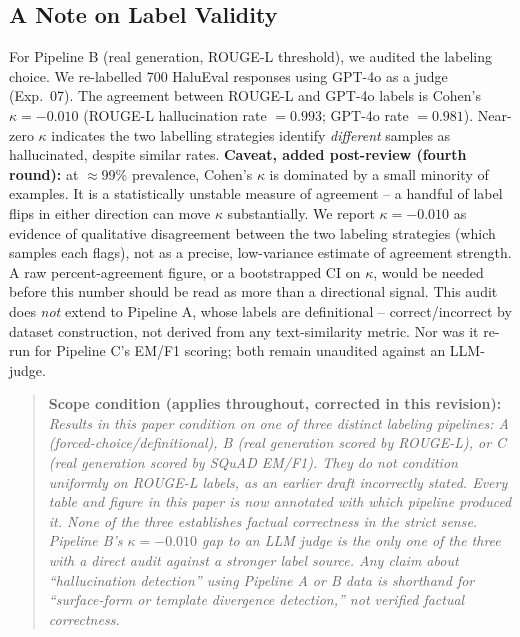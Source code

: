 \documentclass[onecolumn]{jmlr}
\begin{document}
\subsection{A Note on Label Validity}
\label{sec:setup-labels}

For Pipeline B (real generation, ROUGE-L threshold), we audited the
labeling choice. We re-labelled 700 HaluEval responses using GPT-4o as a
judge (Exp.~07). The agreement between ROUGE-L and GPT-4o labels is
Cohen's $\kappa = -0.010$ (ROUGE-L hallucination rate $= 0.993$; GPT-4o
rate $= 0.981$). Near-zero $\kappa$ indicates the two labelling
strategies identify \emph{different} samples as hallucinated, despite
similar rates. \textbf{Caveat, added post-review (fourth round):} at
$\approx$99\% prevalence, Cohen's $\kappa$ is dominated by a small
minority of examples. It is a statistically unstable measure of
agreement -- a handful of label flips in either direction can move
$\kappa$ substantially. We report $\kappa=-0.010$ as evidence of
qualitative disagreement between the two labeling strategies (which
samples each flags), not as a precise, low-variance estimate of
agreement strength. A raw percent-agreement figure, or a bootstrapped CI
on $\kappa$, would be needed before this number should be read as more
than a directional signal. This audit does \emph{not} extend to
Pipeline A, whose labels are definitional -- correct/incorrect by
dataset construction, not derived from any text-similarity metric. Nor
was it re-run for Pipeline C's EM/F1 scoring; both remain unaudited
against an LLM-judge.

\begin{quote}
\textbf{Scope condition (applies throughout, corrected in this revision):}
\textit{Results in this paper condition on \emph{one of three distinct
labeling pipelines}: A (forced-choice/definitional), B (real generation
scored by ROUGE-L), or C (real generation scored by SQuAD EM/F1). They
do not condition uniformly on ROUGE-L labels, as an earlier draft
incorrectly stated. Every table and figure in this paper is now
annotated with which pipeline produced it. None of the three establishes
factual correctness in the strict sense. Pipeline B's $\kappa = -0.010$
gap to an LLM judge is the only one of the three with a direct audit
against a stronger label source. Any claim about ``hallucination
detection'' using Pipeline A or B data is shorthand for ``surface-form
or template divergence detection,'' not verified factual correctness.}
\end{quote}
\end{document}
